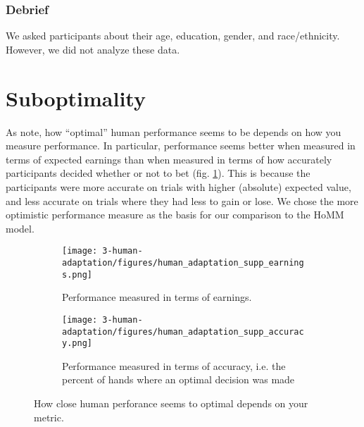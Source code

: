 \subsubsection{Debrief}
We asked participants about their age, education, gender, and race/ethnicity. However, we did not analyze these data.


\section{Suboptimality}\label{appendix:human:suboptimality}
As \citet{Jarvstad2013} note, how ``optimal'' human performance seems to be depends on how you measure performance. In particular, performance seems better when measured in terms of expected earnings than when measured in terms of how accurately participants decided whether or not to bet (fig. \ref{fig:appx_human_calibration}). This is because the participants were more accurate on trials with higher (absolute) expected value, and less accurate on trials where they had less to gain or lose. We chose the more optimistic performance measure as the basis for our comparison to the HoMM model.
\begin{figure}[H]
\centering
\begin{subfigure}[t]{0.5\textwidth}
\texttt{[image: 3-human-adaptation/figures/human\_adaptation\_supp\_earnings.png]}
\caption{Performance measured in terms of earnings.}
\end{subfigure}%
\begin{subfigure}[t]{0.5\textwidth}
\texttt{[image: 3-human-adaptation/figures/human\_adaptation\_supp\_accuracy.png]}
\caption{Performance measured in terms of accuracy, i.e. the percent of hands where an optimal decision was made}
\end{subfigure}%
\caption{How close human perforance seems to optimal depends on your metric.} \label{fig:appx_human_calibration}
\end{figure}



